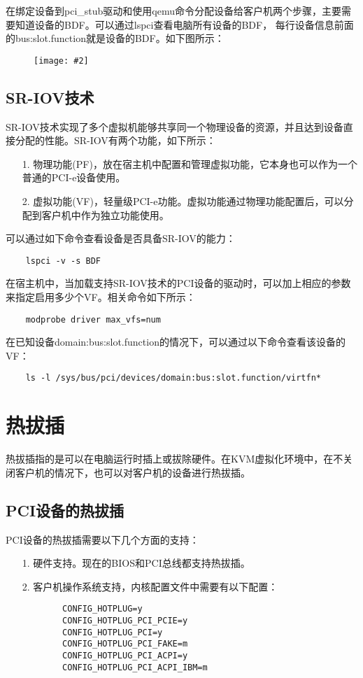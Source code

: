 \documentclass[a4paper,left=2.5cm,right=2.5cm,11pt]{article}
\newcommand{\sizedfic}[2]{\begin{figure}[H]
		\center
		\texttt{[image: \#2]}
	\end{figure}}
\begin{document}
	在绑定设备到pci\_stub驱动和使用qemu命令分配设备给客户机两个步骤，主要需要知道设备的BDF。可以通过lspci查看电脑所有设备的BDF，
	每行设备信息前面的bus:slot.function就是设备的BDF。如下图所示：
	\sizedfic{0.75}{3.png}

\subsection{SR-IOV技术}
	SR-IOV技术实现了多个虚拟机能够共享同一个物理设备的资源，并且达到设备直接分配的性能。SR-IOV有两个功能，如下所示：
	\begin{itemize}
		\item[1.] 物理功能(PF)，放在宿主机中配置和管理虚拟功能，它本身也可以作为一个普通的PCI-e设备使用。
		\item[2.] 虚拟功能(VF)，轻量级PCI-e功能。虚拟功能通过物理功能配置后，可以分配到客户机中作为独立功能使用。
	\end{itemize}

	可以通过如下命令查看设备是否具备SR-IOV的能力：
	\begin{lstlisting}
	lspci -v -s BDF
	\end{lstlisting}

	在宿主机中，当加载支持SR-IOV技术的PCI设备的驱动时，可以加上相应的参数来指定启用多少个VF。相关命令如下所示：
	\begin{lstlisting}
	modprobe driver max_vfs=num
	\end{lstlisting}

	在已知设备domain:bus:slot.function的情况下，可以通过以下命令查看该设备的VF：
	\begin{lstlisting}
	ls -l /sys/bus/pci/devices/domain:bus:slot.function/virtfn*
	\end{lstlisting}

\clearpage

\section{热拔插}
	热拔插指的是可以在电脑运行时插上或拔除硬件。在KVM虚拟化环境中，在不关闭客户机的情况下，也可以对客户机的设备进行热拔插。

\subsection{PCI设备的热拔插}
	PCI设备的热拔插需要以下几个方面的支持：
	\begin{itemize}
		\item[1.] 硬件支持。现在的BIOS和PCI总线都支持热拔插。
		\item[2.] 客户机操作系统支持，内核配置文件中需要有以下配置：
		\begin{lstlisting}
		CONFIG_HOTPLUG=y
		CONFIG_HOTPLUG_PCI_PCIE=y
		CONFIG_HOTPLUG_PCI=y
		CONFIG_HOTPLUG_PCI_FAKE=m
		CONFIG_HOTPLUG_PCI_ACPI=y
		CONFIG_HOTPLUG_PCI_ACPI_IBM=m
		\end{lstlisting}
	\end{itemize}
\end{document}
